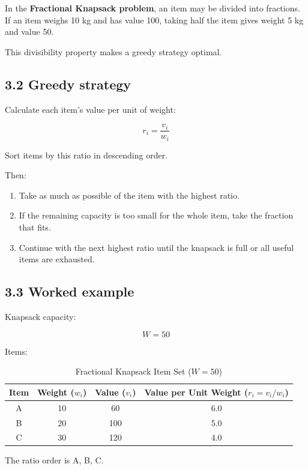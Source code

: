 In the \textbf{Fractional Knapsack problem}, an item may be divided into fractions. If an item weighs 10 kg and has value 100, taking half the item gives weight 5 kg and value 50.

This divisibility property makes a greedy strategy optimal.

\subsection{3.2 Greedy strategy}

Calculate each item's value per unit of weight:


\[
\boxed{r_i=\frac{v_i}{w_i}}
\]


Sort items by this ratio in descending order.

Then:

\begin{enumerate}
    \item Take as much as possible of the item with the highest ratio.
    \item If the remaining capacity is too small for the whole item, take the fraction that fits.
    \item Continue with the next highest ratio until the knapsack is full or all useful items are exhausted.
\end{enumerate}

\subsection{3.3 Worked example}

Knapsack capacity:


\[
W=50
\]


Items:

\begin{table}[htbp]
\centering
\caption{Fractional Knapsack Item Set ($W = 50$)}
\label{tab:fractional_knapsack_data}
\begin{tabular}{cccc}
\toprule
\textbf{Item} & \textbf{Weight ($w_i$)} & \textbf{Value ($v_i$)} & \textbf{Value per Unit Weight ($r_i = v_i/w_i$)} \\
\midrule
A & 10 & 60 & 6.0 \\
B & 20 & 100 & 5.0 \\
C & 30 & 120 & 4.0 \\
\bottomrule
\end{tabular}
\end{table}

The ratio order is A, B, C.

